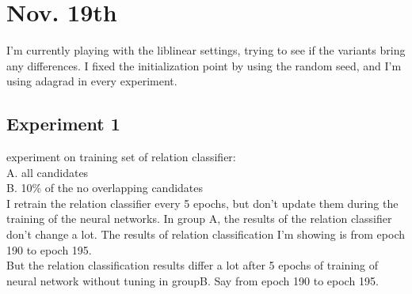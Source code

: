 \documentclass[a4paper, 12pt]{article}
\begin{document}
\section{Nov. 19th}

I'm currently playing with the liblinear settings, trying to see if the variants
bring any differences. I fixed the initialization point by using the random
seed, and I'm using adagrad in every experiment.

\subsection{Experiment 1}
experiment on training set of relation classifier:\\
A. all candidates\\
B. 10\% of the no overlapping candidates\\
I retrain the relation classifier every 5 epochs, but don't update them during
the training of the neural networks. In group A, the results of the relation
classifier don't change a lot. The results of relation classification I'm
showing is from epoch 190 to epoch 195.\\
But the relation classification results differ a lot after 5 epochs of
training of neural network without tuning in groupB. Say from epoch 190 to epoch 195.\\
\end{document}
